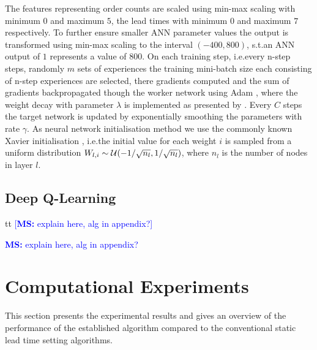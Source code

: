 \documentclass[envcountsame]{llncs}
\newcommand\MS[2][r]{\ifx t#1 \textcolor{blue}{[\textbf{MS:} #2]}
  \else \begin{center}\textcolor{blue}{\textbf{MS:} #2} \end{center} \fi}
\begin{document}
The features representing order counts are scaled using min-max scaling with minimum \(0\) and
maximum \(5\), the lead times with minimum \(0\) and maximum \(7\) respectively.
To further ensure smaller ANN parameter values the output is transformed using min-max scaling to
the interval \((-400, 800)\), s.t.\@ an ANN output of \(1\) represents a value of \(800\).
%
On each training step, i.e.\@ every n-step steps, randomly \(m\) sets of experiences the training
mini-batch size each consisting of n-step experiences are selected, there gradients computed and the
sum of gradients backpropagated though the worker network using Adam \citep{kingma2014adam}, where
the weight decay with parameter \(\lambda\) is implemented as presented by
\citet{loshchilov2017decoupled}.
%
Every \(C\) steps the target network is updated by exponentially smoothing the parameters with rate
\(\gamma\).
%
As neural network
initialisation method we use the commonly known Xavier initialisation
\citep{glorot2010understanding}, i.e.\@ the initial value for each weight \(i\) is sampled from a
uniform distribution \(W_{l,i} \sim \mathcal{U}(-1/\sqrt{n_l},1/\sqrt{n_l})\), where \(n_{l}\) is the
number of nodes in layer \(l\).
%


\subsection{Deep Q-Learning}
\MS[t]{explain here, alg in appendix?}


\section{Computational Experiments}
\label{sec:Preliminary}

This section presents the experimental results and gives an overview of the performance of the
established algorithm compared to the conventional static lead time setting algorithms.

\end{document}
